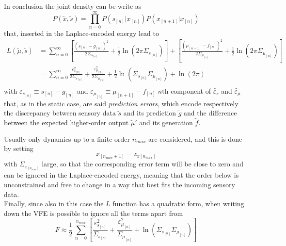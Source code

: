 \documentclass[a4paper, 10pt]{article}
\begin{document}
In conclusion the joint density can be write as
\begin{equation}
P(\tilde{x}, \tilde{s}) = \prod_{n=0}^{\infty} P(s_{[n]} | x_{[n]}) P(x_{[n+1]} | x_{[n]})
\end{equation}
that, inserted in the Laplace-encoded energy lead to 
\begin{equation}
\begin{split}
L(\tilde{\mu}, \tilde{s}) &= \sum_{n=0}^{\infty} \left[ \frac{(s_{[n]}-g_{[n]})^2}{2 \Sigma_{s_{[n]}}} + \frac{1}{2} \ln (2 \pi \Sigma_{s_{[n]}}) \right] + \left[ \frac{(\mu_{[n+1]}-f_{[n]})^2}{2 \Sigma_{\mu_{[n]}}} + \frac{1}{2} \ln (2 \pi \Sigma_{\mu_{[n]}}) \right] \\
	&= \sum_{n=0}^{\infty} \frac{\varepsilon_{s_{[n]}}^2}{2 \Sigma_{s_{[n]}}} + \frac{\varepsilon_{\mu_{[n]}}^2}{2 \Sigma_{\mu_{[n]}}} + \frac{1}{2} \ln (\Sigma_{s_{[n]}}\Sigma_{\mu_{[n]}}) + \ln(2 \pi)\\
\end{split}
\end{equation}
with $\varepsilon_{s_{[n]}} \equiv s_{[n]}-g_{[n]}$ and $\varepsilon_{\mu_{[n]}} \equiv \mu_{[n+1]}-f_{[n]}$ $n$th component of $\tilde{\varepsilon_{s}}$ and $\tilde{\varepsilon_{\mu}}$ that, as in the static case, are said \emph{prediction errors}, which encode respectively the discrepancy between sensory data $\tilde{s}$ and its prediction $\tilde{g}$ and the difference between the expected higher-order output $\tilde{\mu}'$ and its generation $\tilde{f}$.

Usually only dynamics up to a finite order $n_{max}$ are considered, and this is done by setting 
\begin{equation}
x_{[n_{max}+1]} = z_{x [n_{max}]}
\end{equation}
with $\Sigma_{x_{[n_{max}]}}$ large, so that the corresponding error term will be close to zero and can be ignored in the Laplace-encoded energy, meaning that the order below is unconstrained and free to change in a way that best fits the incoming sensory data.\\
Finally, since also in this case the $L$ function has a quadratic form, when writing down the VFE is possible to ignore all the terms apart from
\begin{equation}
F \approx \frac{1}{2} \, \sum_{n=0}^{n_{max}} \left[ \frac{\varepsilon_{s_{[n]}}^2}{ \Sigma_{s_{[n]}}} + \frac{\varepsilon_{\mu_{[n]}}^2}{\Sigma_{\mu_{[n]}}} + \ln (\Sigma_{s_{[n]}}\Sigma_{\mu_{[n]}}) \right]
\end{equation}
\end{document}
